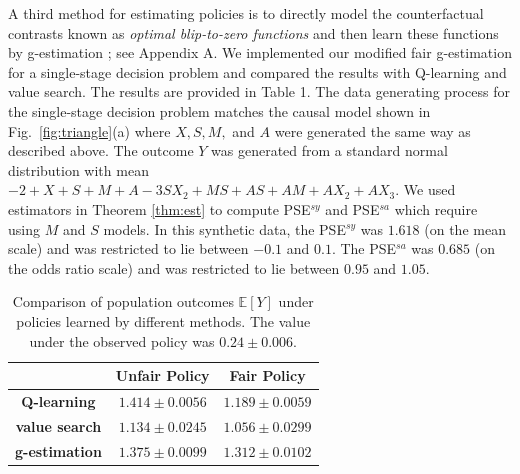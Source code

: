 \documentclass[letterpaper]{article} %
\newcommand{\red}{\textcolor{red}}
\newcommand{\E}{\mathbb{E}}
\begin{document}
A third method for estimating policies is to directly model the counterfactual contrasts known as \emph{optimal blip-to-zero functions} and then learn these functions by g-estimation \citep{robins04SNMM}; see Appendix A. We implemented our modified fair g-estimation for a single-stage decision problem and compared the results with Q-learning and value search. The results are provided in Table 1. The data generating process for the single-stage decision problem matches the causal model shown in Fig.~\ref{fig:triangle}(a) where  $X, S, M,$ and $A$ were generated the same way as described above. The outcome $Y$ was generated from a standard normal distribution with mean $-2 + X + S + M + A -3SX_2 + MS + AS + AM + AX_2 + AX_3$. 
We used estimators in Theorem \ref{thm:est} to compute PSE$^{sy}$ and PSE$^{sa}$ which require using $M$ and $S$ models. In this synthetic data, the PSE$^{sy}$ was $1.618$ (on the mean scale) and was restricted to lie between $-0.1$ and $0.1$. The PSE$^{sa}$ was $0.685$ (on the odds ratio scale) and was restricted to lie between $0.95$ and $1.05$. 


\begin{table}[t!]
	\label{tab:outcome}
	\centering
	\begin{tabular}{ c | c | c }
		& \small \textbf{Unfair Policy} & \small \textbf{Fair Policy}  \\  [0.1cm]
		\hline
		\small \textbf{Q-learning }  & $ 1.414 \!\pm\! 0.0056 $ &  $ 1.189 \!\pm\! 0.0059 $ \\  [0.1cm]
		\small \textbf{value search }  & $ 1.134 \!\pm\! 0.0245 $ &  $ 1.056 \!\pm\!  0.0299 $ \\ [0.1cm]
		\small \textbf{g-estimation }  & $ 1.375  \!\pm\! 0.0099  $ &  $ 1.312 \!\pm\! 0.0102 $ 
	\end{tabular}
	\caption{{\small Comparison of population outcomes $\E[Y]$ under policies learned by different methods. The value under the observed policy was $ 0.24 \!\pm\! 0.006 $. }}
\end{table}
\end{document}
